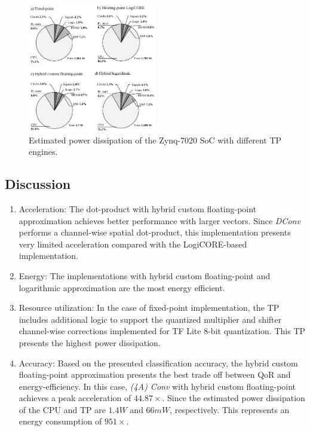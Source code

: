\begin{figure}[t!]
	\centering
	\includegraphics[width=0.5\textwidth]{../figures/power_breackdown.pdf}
	\caption{Estimated power dissipation of the Zynq-7020 SoC with different TP engines.}
	\label{fig:power}
\end{figure}


\subsection{Discussion}
\begin{enumerate}
	\item{Acceleration}: The dot-product with hybrid custom floating-point approximation achieves better performance with larger vectors. Since \emph{DConv} performs a channel-wise spatial dot-product, this implementation presents very limited acceleration compared with the LogiCORE-based implementation.
	
	\item{Energy}: The implementations with hybrid custom floating-point and logarithmic approximation are the most energy efficient.
	
	\item{Resource utilization}: In the case of fixed-point implementation, the TP includes additional logic to support the quantized multiplier and shifter channel-wise corrections implemented for TF Lite 8-bit quantization. This TP presents the highest power dissipation.
	
	\item{Accuracy}: Based on the presented classification accuracy, the hybrid custom floating-point approximation presents the best trade off between QoR and energy-efficiency. In this case, \emph{(4A) Conv} with hybrid custom floating-point achieves a peak acceleration of $44.87\times$. Since the estimated power dissipation of the CPU and TP are $1.4W$ and $66mW$, respectively. This represents an energy consumption of $951\times$.
\end{enumerate}